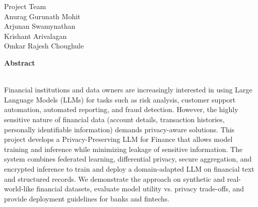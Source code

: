 \documentclass[12pt,a4paper]{report}
\newcommand{\sectionleft}[1]{%
    \vspace*{1cm}%
    {\raggedright\bfseries\fontsize{24}{28}\selectfont #1\par}
    \vspace{1cm}
}
\begin{document}
\begin{flushright}
    Project Team \\
    Anurag Gurunath Mohit \\
    Arjunan Swamynathan \\
    Krishant Arivalagan \\
    Omkar Rajesh Choughule
\end{flushright}

\newpage

\sectionleft{Abstract}
\thispagestyle{plain}


\textbf \\ Financial institutions and data owners are increasingly interested in using Large Language Models (LLMs) for tasks such as risk analysis, customer support automation, automated reporting, and fraud detection. However, the highly sensitive nature of financial data (account details, transaction histories, personally identifiable information) demands privacy-aware solutions. This project develops a Privacy-Preserving LLM for Finance that allows model training and inference while minimizing leakage of sensitive information. The system combines federated learning, differential privacy, secure aggregation, and encrypted inference to train and deploy a domain-adapted LLM on financial text and structured records. We demonstrate the approach on synthetic and real-world-like financial datasets, evaluate model utility vs. privacy trade-offs, and provide deployment guidelines for banks and fintechs.


\newpage
\end{document}
